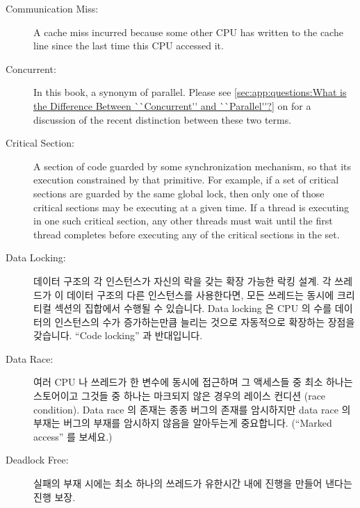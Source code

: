 \begin{description}
\item[Communication Miss:]
	A cache miss incurred because some other CPU has written to
	the cache line since the last time this CPU accessed it.
\item[Concurrent:]
	In this book, a synonym of parallel.
	Please see \cref{sec:app:questions:What is the Difference Between ``Concurrent'' and ``Parallel''?}
	on 
	for a discussion of the recent distinction between these two
	terms.
\item[Critical Section:]
	A section of code guarded by some synchronization mechanism,
	so that its execution constrained by that primitive.
	For example, if a set of critical sections are guarded by
	the same global lock, then only one of those critical sections
	may be executing at a given time.
	If a thread is executing in one such critical section,
	any other threads must wait until the first thread completes
	before executing any of the critical sections in the set.

\fi

\item[Data Locking:]
	데이터 구조의 각 인스턴스가 자신의 락을 갖는 확장 가능한 락킹 설계.
	각 쓰레드가 이 데이터 구조의 다른 인스턴스를 사용한다면, 모든 쓰레드는
	동시에 크리티컬 섹션의 집합에서 수행될 수 있습니다.
	Data locking 은 CPU 의 수를 데이터의 인스턴스의 수가 증가하는만큼
	늘리는 것으로 자동적으로 확장하는 장점을 갖습니다.
	``Code locking'' 과 반대입니다.
\item[Data Race:]
	여러 CPU 나 쓰레드가 한 변수에 동시에 접근하며 그 액세스들 중 최소
	하나는 스토어이고 그것들 중 하나는 마크되지 않은 경우의 레이스 컨디션
	(race condition).
	Data race 의 존재는 종종 버그의 존재를 암시하지만 data race 의 부재는
	버그의 부재를 암시하지 않음을 알아두는게 중요합니다.
	(``Marked access'' 를 보세요.)
\item[Deadlock Free:]
	실패의 부재 시에는 최소 하나의 쓰레드가 유한시간 내에 진행을 만들어
	낸다는 진행 보장.

\iffalse


\end{description}
